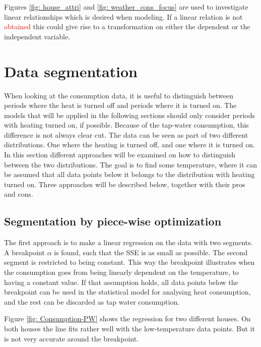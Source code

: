 Figures \ref{fig: house_attri} and \ref{fig: weather_cons_focus} are used to investigate linear relationships which is desired when modeling. If a linear relation is not \textcolor{red}{obtained} this could give rise to a transformation on either the dependent or the independent variable.  

\section{Data segmentation}
When looking at the consumption data, it is useful to distinguish between
periods where the heat is turned off and periods where it is turned on.
The models that will be applied in the following sections should only consider periods with heating turned on, if possible.
Because of the tap-water consumption, this difference is not always clear cut.
The data can be seen as part of two different distributions. One where the
heating is turned off, and one where it is turned on. In this section different 
approaches will be examined on how to distinguish between the two distributions.
The goal is to find some temperature, where it can be assumed that all data points below it
belongs to the distribution with heating turned on. Three approaches will be described below, together with their pros and cons.

\subsection{Segmentation by piece-wise optimization}
The first approach is to make a linear regression on the data with two segments.
A breakpoint $\alpha$ is found, such that the SSE is as small as possible.
The second segment is restricted to being constant. This way the breakpoint
illustrates when the consumption goes from being linearly dependent on the temperature,
to having a constant value. If that assumption holds, all data points below the breakpoint
can be used in the statistical model for analysing heat consumption, and the rest can be discarded
as tap water consumption.

Figure \ref{fig: Consumption-PW} shows the regression for two different houses. On both houses the
line fits rather well with the low-temperature data points. But it is not very accurate around the breakpoint.


